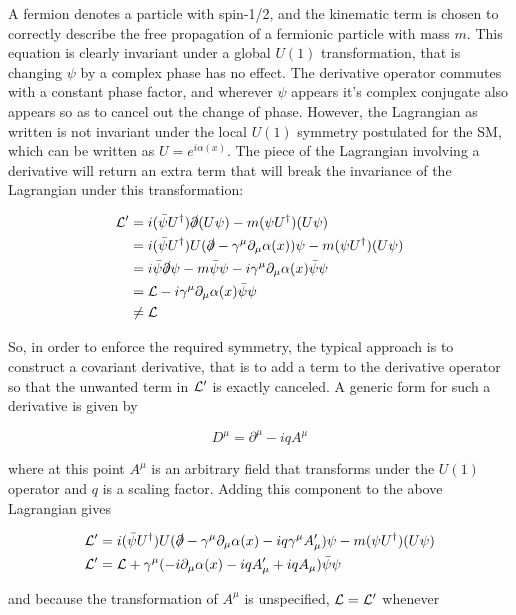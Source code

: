 \noindent A fermion denotes a particle with spin-1/2, and the kinematic term is chosen to correctly describe the free propagation of a fermionic particle with mass $m$. 
This equation is clearly invariant under a global $U(1)$ transformation, that is changing $\psi$ by a complex phase has no effect. 
The derivative operator commutes with a constant phase factor, and wherever $\psi$ appears it's complex conjugate also appears so as to cancel out the change of phase. 
However, the Lagrangian as written is not invariant under the local $U(1)$ symmetry postulated for the \ac{SM}, which can be written as $U = e^{i\alpha(x)}$. 
The piece of the Lagrangian involving a derivative will return an extra term that will break the invariance of the Lagrangian under this transformation:

\begin{align*}
 \mathcal{L}' &= i (\bar{\psi}U^\dagger)\slashed{\partial}(U\psi) - m(\psi U^\dagger)(U\psi) \\
      &= i (\bar{\psi}U^\dagger) U(\slashed{\partial} - \gamma^\mu \partial_\mu\alpha(x))\psi - m(\psi U^\dagger)(U\psi) \\
      &= i \bar{\psi}\slashed{\partial}\psi -m\bar{\psi}\psi - i\gamma^\mu \partial_\mu\alpha(x)\bar{\psi}\psi  \\
      &= \mathcal{L} -  i\gamma^\mu \partial_\mu\alpha(x)\bar{\psi}\psi \\
      &\neq \mathcal{L} 
\end{align*}

\noindent So, in order to enforce the required symmetry, the typical approach is to construct a covariant derivative, that is to add a term to the derivative operator so that the unwanted term in $\mathcal{L}'$ is exactly canceled. 
A generic form for such a derivative is given by

\[ D^\mu = \partial^{\mu} - iqA^\mu \]

\noindent where at this point $A^\mu$ is an arbitrary field that transforms under the $U(1)$ operator and $q$ is a scaling factor. Adding this component to the above Lagrangian gives

\begin{align}
 \mathcal{L}' &=  i (\bar{\psi}U^\dagger) U(\slashed{\partial} - \gamma^\mu \partial_\mu\alpha(x) - iq\gamma^\mu A'_{\mu})\psi - m(\psi U^\dagger)(U\psi) \\
 \mathcal{L}' &= \mathcal{L} +\gamma^\mu (- i\partial_\mu\alpha(x) - iqA'_{\mu} + iqA_\mu)\bar{\psi}\psi 
\end{align}

\noindent and because the transformation of $A^\mu$ is unspecified, $\mathcal{L} = \mathcal{L}'$ whenever

